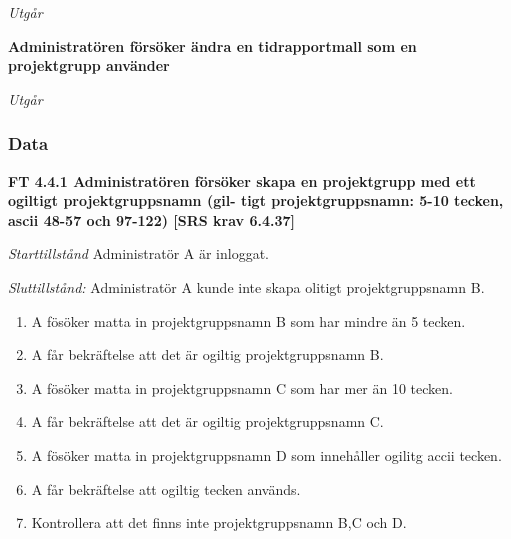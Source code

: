 \documentclass[a4paper]{article}
\begin{document}
\begin{FT}
\emph{Utgår}



\item %
\textbf{Administratören försöker ändra en tidrapportmall som en projektgrupp använder}

\emph{Utgår}



\end{FT}
\subsubsection{Data}
\textbf{FT 4.4.1 Administratören försöker skapa en projektgrupp med ett ogiltigt projektgruppsnamn (gil- tigt projektgruppsnamn: 5-10 tecken, ascii 48-57 och 97-122) [SRS krav 6.4.37]}

\emph{Starttillstånd} Administratör A  är inloggat.

\emph{Sluttillstånd:} Administratör A kunde inte skapa olitigt projektgruppsnamn B.

\begin{enumerate}
\item A fösöker matta in projektgruppsnamn B som har mindre än 5 tecken.
\item A får bekräftelse att det är ogiltig projektgruppsnamn B.
\item A fösöker matta in projektgruppsnamn C som har mer än 10 tecken.
\item A får bekräftelse att det är ogiltig projektgruppsnamn C.
\item A fösöker matta in projektgruppsnamn D som innehåller ogilitg accii tecken.
\item A får bekräftelse att ogiltig tecken används.
\item Kontrollera att det finns inte  projektgruppsnamn B,C och D.

\end{enumerate}
\end{document}
